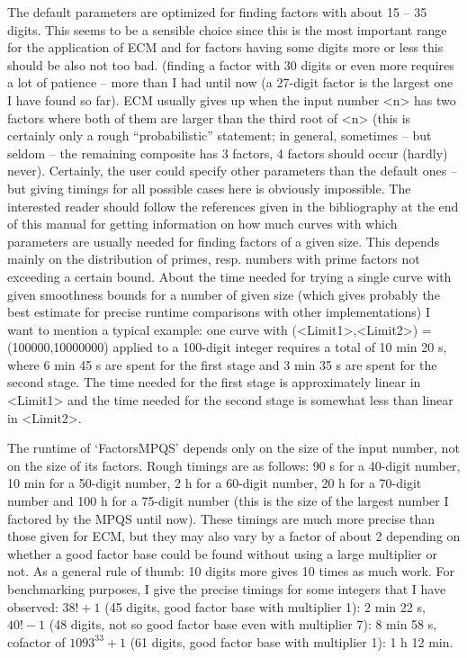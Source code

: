 The default parameters are optimized for finding factors with about
15 -- 35 digits. This seems to be a sensible choice since this is the
most important range for the application of ECM and for factors
having some digits more or less this should be also not too bad.
(finding a factor with 30 digits or even more requires a lot of
patience -- more than I had until now (a 27-digit factor is the largest
one I have found so far).
ECM usually gives up when the input number <n> has two factors where 
both of them are larger than the third root of <n> (this is certainly
only a rough ``probabilistic'' statement; in general, sometimes 
-- but seldom -- the remaining composite has 3 factors, 4 factors
should occur (hardly) never). 
Certainly, the user could specify other parameters than 
the default ones -- but giving timings for all possible cases here is
obviously impossible. The interested reader should follow the references
given in the bibliography at the end of this manual for getting
information on how much curves with which parameters are usually 
needed for finding factors of a given size. This depends mainly on the
distribution of primes, resp. numbers with prime factors not exceeding a
certain bound.
About the time needed for trying a single curve with given smoothness
bounds for a number of given size (which gives probably the best estimate
for precise runtime comparisons with other implementations) I want to
mention a typical example: one curve with (<Limit1>,<Limit2>) =
(100000,10000000) applied to a 100-digit integer requires a total of
10 min 20 s, where 6 min 45 s are spent for the first stage
and 3 min 35 s are spent for the second stage.
The time needed for the first stage is approximately linear in <Limit1>
and the time needed for the second stage is somewhat less than linear
in <Limit2>.


The runtime of `FactorsMPQS' depends only on the size of the input
number, not on the size of its factors.
Rough timings are as follows: 90 s for a 40-digit number, 10 min for a
50-digit number, 2 h for a 60-digit number, 20 h for a 70-digit
number and 100 h for a 75-digit number (this is the size of the
largest number I factored by the MPQS until now).
These timings are much more precise
than those given for ECM, but they may also vary by a factor of about 2
depending on whether a good factor base could be found without using
a large multiplier or not.
As a general rule of thumb: 10 digits more gives 10 times as much
work. 
For benchmarking purposes, I give the precise timings for some integers
that I have observed: $38! + 1$ (45 digits, good factor base with
multiplier 1): 2 min 22 s, $40! - 1$ (48 digits, not so good factor
base even with multiplier 7): 8 min 58 s, cofactor of $1093^{33}+1$
(61 digits, good factor base with multiplier 1): 1 h 12 min.

